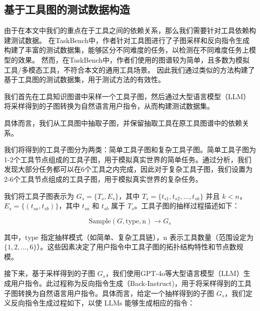 

\subsection{基于工具图的测试数据构造}

由于在本文中我们的重点在于工具之间的依赖关系，那么我们需要针对工具依赖构建测试数据。
在TaskBench\cite{shen2023taskbench}中，作者针对工具图进行了子图采样和反向指令生成构建了丰富的测试数据集，能够区分不同难度的任务，以检测在不同难度任务上模型的效果。
然而，在TaskBench中，作者们使用的图谱较为简单，且多数为模拟工具/多模态工具，不符合本文的通用工具场景。
因此我们通过类似的方法构建了基于工具图的测试数据集，用于测试方法的有效性。

我们首先在工具知识图谱中采样一个工具子图，然后通过大型语言模型（LLM）将采样得到的子图转换为自然语言用户指令，从而构建测试数据集。

具体而言，我们从工具图中抽取子图，并保留抽取工具在原工具图谱中的依赖关系。

我们将得到的工具子图分为两类：简单工具子图和复杂工具子图。简单工具子图为1-2个工具节点组成的工具子图，用于模拟真实世界的简单任务。通过分析，我们发现大部分任务都可以在6个工具之内完成，因此对于复杂工具子图，我们设置为2-6个工具节点组成的工具子图，用于模拟真实世界的复杂任务。

我们将工具子图表示为 \( G_s = \{T_s, E_s\} \)，其中 \( T_s = \{t_{s1}, t_{s2}, \dots, t_{sk}\} \) 并且 \( k < n \)，\( E_s = \{(t_{sa}, t_{sb})\} \)，其中 \( t_{sa} \) 和 \( t_{sb} \) 属于 \( T_s \)。工具子图的抽样过程描述如下：

\[
\text{Sample}(G, \text{type}, \text{n}) \rightarrow G_s
\]

其中，\(\text{type}\) 指定抽样模式（如简单、复杂工具链），\(\text{n}\) 表示工具数量（范围设定为 \(\{1, 2, \dots, 6\}\)）。这些因素决定了用户指令中工具子图的拓扑结构特性和节点数规模。

接下来，基于采样得到的子图 \( G_s \)，我们使用GPT-4o等大型语言模型（LLM）生成用户指令。此过程称为反向指令生成（Back-Instruct)，用于将采样得到的工具子图转换为自然语言用户指令。具体而言，给定一个抽样得到的子图 \( G_s \)，我们定义反向指令生成过程如下，以使 LLMs 能够生成相应的指令：

